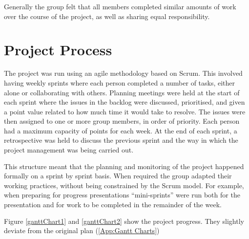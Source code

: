 Generally the group felt that all members completed similar amounts of work over the course of the project, as well as sharing equal responsibility.

\section{Project Process}
\label{Section:Project Process}

The project was run using an agile methodology based on Scrum. This involved having weekly sprints where each person completed a number of tasks, either alone or collaborating with others. Planning meetings were held at the start of each sprint where the issues in the backlog were discussed, prioritised, and given a point value related to how much time it would take to resolve. The issues were then assigned to one or more group members, in order of priority. Each person had a maximum capacity of points for each week. At the end of each sprint, a retrospective was held to discuss the previous sprint and the way in which the project management was being carried out.

This structure meant that the planning and monitoring of the project happened formally on a sprint by sprint basis. When required the group adapted their working practices, without being constrained by the Scrum model. For example, when preparing for progress presentations ``mini-sprints'' were run both for the presentation and for work to be completed in the remainder of the week.

Figure \cref{ganttChart1} and \cref{ganttChart2} show the project progress.
They slightly deviate from the original plan (\autoref{App:Gantt Charts})

